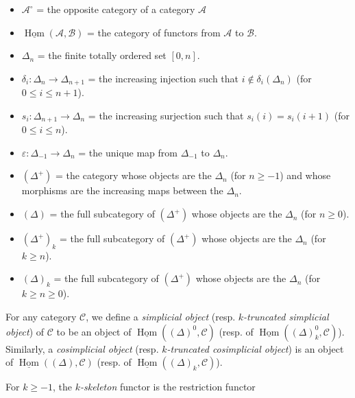     \begin{itemize}\item{}\(\mathscr {A}^\circ \)
        = the opposite category of a category \(\mathscr {A}\)
      \item{}\(\underline {\operatorname {Hom}}(\mathscr {A},\mathscr {B})\)
        = the category of functors from \(\mathscr {A}\) to \(\mathscr {B}\).
      \item{}\(\Delta _n\)
        = the finite totally ordered set \([0,n]\).
      \item{}\(\delta _i\colon \Delta _n\to \Delta _{n+1}\)
        = the increasing injection such that \(i\not \in \delta _i(\Delta _n)\) (for \(0\leqslant  i\leqslant  n+1\)).
      \item{}\(s_i\colon \Delta _{n+1}\to \Delta _n\)
        = the increasing surjection such that \(s_i(i)=s_i(i+1)\) (for \(0\leqslant  i\leqslant  n\)).
      \item{}\(\varepsilon \colon \Delta _{-1}\to \Delta _n\)
        = the unique map from \(\Delta _{-1}\) to \(\Delta _n\).
      \item{}\((\Delta ^+)\)
        = the category whose objects are the \(\Delta _n\) (for \(n\geqslant -1\)) and whose morphisms are the increasing maps between the \(\Delta _n\).
      \item{}\((\Delta )\)
        = the full subcategory of \((\Delta ^+)\) whose objects are the \(\Delta _n\) (for \(n\geqslant 0\)).
      \item{}\((\Delta ^+)_k\)
        = the full subcategory of \((\Delta ^+)\) whose objects are the \(\Delta _n\) (for \(k\geqslant  n\)).
      \item{}\((\Delta )_k\)
        = the full subcategory of \((\Delta ^+)\) whose objects are the \(\Delta _n\) (for \(k\geqslant  n\geqslant 0\)).\end{itemize}\par{}For any category \(\mathscr {C}\), we define a \emph{simplicial object} (resp. \emph{\(k\)-truncated simplicial object}) of \(\mathscr {C}\) to be an object of \(\underline {\operatorname {Hom}}((\Delta )^0,\mathscr {C})\) (resp. of \(\underline {\operatorname {Hom}}((\Delta )^0_k,\mathscr {C})\)).
    Similarly, a \emph{cosimplicial object} (resp. \emph{\(k\)-truncated cosimplicial object}) is an object of \(\underline {\operatorname {Hom}}((\Delta ),\mathscr {C})\) (resp. of \(\underline {\operatorname {Hom}}((\Delta )_k,\mathscr {C})\)).\par{}For \(k\geqslant -1\), the \emph{\(k\)-skeleton} functor is the restriction functor
